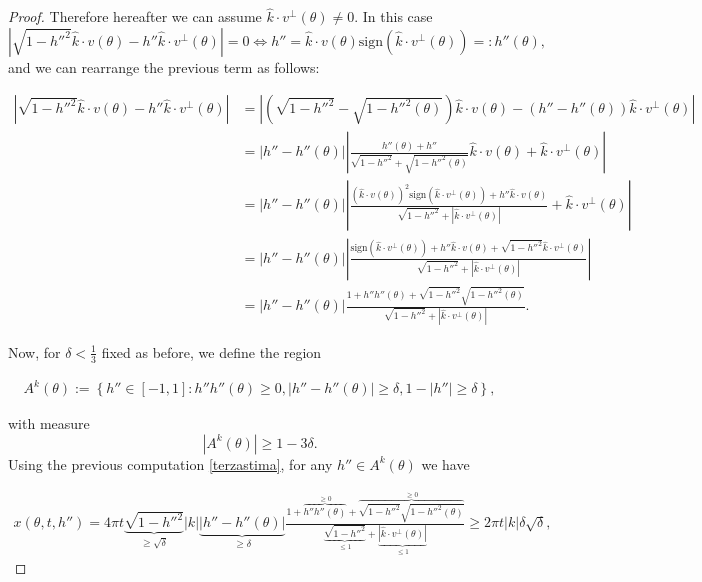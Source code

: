 \documentclass[a4paper,10pt,reqno]{amsart}
\numberwithin{equation}{subsection}
\numberwithin{figure}{subsection}
\begin{document}
\begin{proof}
Therefore hereafter we can assume $\hat k\cdot v^{\perp}(\theta)\neq0$. In this case
\[
\left|\sqrt{1-h''^2}\hat k\cdot v(\theta)-h''\hat k\cdot v^{\perp}(\theta)\right|=0\Leftrightarrow h''=\hat k\cdot v(\theta)\textrm{sign}(\hat k\cdot v^{\perp}(\theta))=:h''(\theta),
\]
and we can rearrange the previous term as follows:

{\scriptsize\begin{align}
\nonumber\left|\sqrt{1-h''^2}\hat k\cdot v(\theta)-h''\hat k\cdot v^{\perp}(\theta)\right|&=\left|(\sqrt{1-h''^2}-\sqrt{1-h''^2(\theta)})\hat k\cdot v(\theta)-(h''-h''(\theta))\hat k\cdot v^{\perp}(\theta)\right|
\\
\nonumber&=|h''-h''(\theta)|\left|\frac{h''(\theta)+h''}{\sqrt{1-h''^2}+\sqrt{1-h''^2(\theta)}}\hat k\cdot v(\theta)+\hat k\cdot v^{\perp}(\theta)\right|
\\
\nonumber&=|h''-h''(\theta)|\left|\frac{(\hat k\cdot v(\theta))^2\textrm{sign}(\hat k\cdot v^{\perp}(\theta))+h''\hat k\cdot v(\theta)}{\sqrt{1-h''^2}+|\hat k\cdot v^{\perp}(\theta)|}+\hat k\cdot v^{\perp}(\theta)\right|
\\
\nonumber&=|h''-h''(\theta)|\left|\frac{\textrm{sign}(\hat k\cdot v^{\perp}(\theta))+h''\hat k\cdot v(\theta)+\sqrt{1-h''^2}\hat k\cdot v^{\perp}(\theta)}{\sqrt{1-h''^2}+|\hat k\cdot v^{\perp}(\theta)|}\right|
\\
\label{terzastima}&=|h''-h''(\theta)|\frac{1+h''h''(\theta)+\sqrt{1-h''^2}\sqrt{1-h''^2(\theta)}}{\sqrt{1-h''^2}+|\hat k\cdot v^{\perp}(\theta)|}.
\end{align}}

Now, for $\delta<\frac{1}{3}$ fixed as before, we define the region

\begin{align}\label{misuraAtheta}
A^k(\theta):=\left\{h''\in[-1,1]:h''h''(\theta)\geq0,|h''-h''(\theta)|\geq\delta,1-|h''|\geq\delta\right\},
\end{align}

with measure 
\[
|A^k(\theta)|\geq1-3\delta.
\]
Using the previous computation \eqref{terzastima}, for any $h''\in A^k(\theta)$ we have

{\footnotesize\begin{align}\label{stimabassox}
x(\theta,t,h'')=4\pi t\underbrace{\sqrt{1-h''^2}}_{\geq\sqrt\delta}|k|\underbrace{|h''-h''(\theta)|}_{\geq\delta}\frac{1+\overbrace{h''h''(\theta)}^{\geq0}+\overbrace{\sqrt{1-h''^2}\sqrt{1-h''^2(\theta)}}^{\geq0}}{\underbrace{\sqrt{1-h''^2}}_{\leq1}+\underbrace{|\hat k\cdot v^{\perp}(\theta)|}_{\leq1}}\geq2\pi t|k|\delta\sqrt\delta,
\end{align}}


\end{proof}
\end{document}
